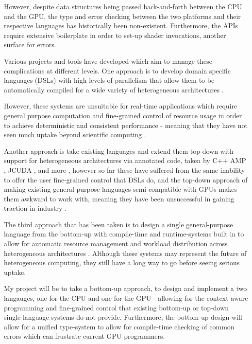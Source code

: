 \documentclass[11pt]{article}
\begin{document}
However, despite data structures being passed back-and-forth between the CPU and
the GPU, the type and error checking between the two platforms and their
respective languages has historically been non-existent. Furthermore, the APIs
require extensive boilerplate in order to set-up shader invocations, another
surface for errors.

Various projects and tools have developed which aim to manage these
complications at different levels. One approach is to develop domain specific
languages (DSLs) with high-levels of parallelism that allow them to be
automatically compiled for a wide variety of heterogeneous architectures
\cite{DSL1} \cite{DSL2} \cite{Theano2016}.

However, these systems are unsuitable for real-time applications which require
general purpose computation and fine-grained control of resource usage in order
to achieve deterministic and consistent performance - meaning that they have not
seen much uptake beyond scientific computing \cite{Theano2016}.

Another approach is take existing languages and extend them top-down with
support for heterogeneous architectures via annotated code, taken by C++ AMP
\cite{CAMP}, JCUDA \cite{JCUDA2009}, and more \cite{SYCL} \cite{HCC}
\cite{Theano2016} \cite{CParallel}, however so far these have suffered from the same inability
to offer the user fine-grained control that DSLs do, and the top-down approach
of making existing general-purpose languages semi-compatible with GPUs makes
them awkward to work with, meaning they have been unsuccessful in gaining
traction in industry \cite{CAMPFail1} \cite{CAMPFail2}.

The third approach that has been taken is to design a single general-purpose
language from the bottom-up with compile-time and runtime-systems built in to
allow for automatic resource management and workload distribution across
heterogeneous architectures \cite{Lime2012} \cite{Lime2010}. Although these
systems may represent the future of heterogeneous computing, they still have a
long way to go before seeing serious uptake.

My project will be to take a bottom-up approach, to design and implement a two
langauges, one for the CPU and one for the GPU - allowing for the context-aware
programming and fine-grained control that existing bottom-up or top-down
single-language systems do not provide. Furthermore, the bottom-up design will
allow for a unified type-system to allow for compile-time checking of common
errors which can frustrate current GPU programmers.
\end{document}
